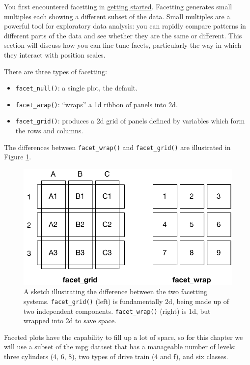 You first encountered facetting in
\protect\hyperlink{sec:qplot-facetting}{getting started}. Facetting
generates small multiples each showing a different subset of the data.
Small multiples are a powerful tool for exploratory data analysis: you
can rapidly compare patterns in different parts of the data and see
whether they are the same or different. This section will discuss how
you can fine-tune facets, particularly the way in which they interact
with position scales.  

There are three types of facetting:

\begin{itemize}
\item
  \texttt{facet\_null()}: a single plot, the default.
\item
  \texttt{facet\_wrap()}: ``wraps'' a 1d ribbon of panels into 2d.
\item
  \texttt{facet\_grid()}: produces a 2d grid of panels defined by
  variables which form the rows and columns.
\end{itemize}

The differences between \texttt{facet\_wrap()} and
\texttt{facet\_grid()} are illustrated in Figure \ref{fig:facet-sketch}.

\begin{figure}[htbp]
  \centering
    \includegraphics[width=0.75\linewidth]{diagrams/position-facets}
  \caption{A sketch illustrating the difference between the two facetting systems. \texttt{facet\_grid()} (left) is fundamentally 2d, being made up of two independent components. \texttt{facet\_wrap()} (right) is 1d, but wrapped into 2d to save space.}
  \label{fig:facet-sketch}
\end{figure}

Faceted plots have the capability to fill up a lot of space, so for this
chapter we will use a subset of the mpg dataset that has a manageable
number of levels: three cylinders (4, 6, 8), two types of drive train (4
and f), and six classes.

